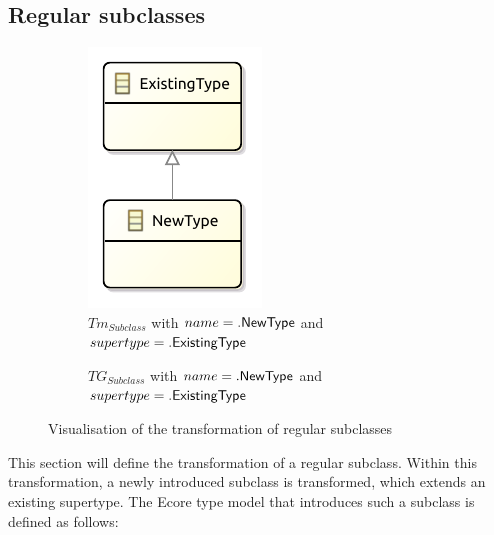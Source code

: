 \subsection{Regular subclasses}
\label{subsec:library_of_transformations:type_level_transformations:regular_subclasses}

\begin{figure}[H]
    \centering
    \begin{subfigure}{0.4\textwidth}
        \centering
        \includegraphics{images/05_library_of_transformations/02_type_level_transformations/03_regular_subclasses/class_subtype.pdf}
        \caption{$Tm_{Subclass}$ with $name = .\mathsf{NewType}$ and $supertype = .\mathsf{ExistingType}$}
        \label{fig:library_of_transformations:type_level_transformations:regular_subclasses:visualisation:ecore}
    \end{subfigure}
    \begin{subfigure}{0.4\textwidth}
        \centering
        
        \caption{$TG_{Subclass}$ with $name = .\mathsf{NewType}$ and $supertype = .\mathsf{ExistingType}$}
        \label{fig:library_of_transformations:type_level_transformations:regular_subclasses:visualisation:groove}
    \end{subfigure}
    \caption{Visualisation of the transformation of regular subclasses}
    \label{fig:library_of_transformations:type_level_transformations:regular_subclasses:visualisation}
\end{figure}

This section will define the transformation of a regular subclass. Within this transformation, a newly introduced subclass is transformed, which extends an existing supertype. The Ecore type model that introduces such a subclass is defined as follows:

